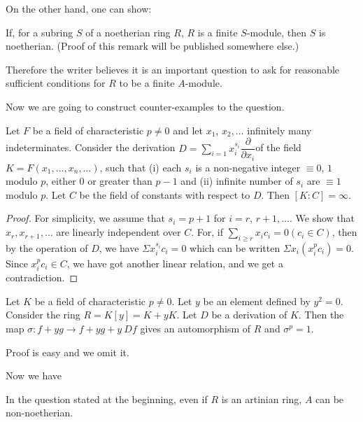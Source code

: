 On the other hand, one can show:

\begin{remark}\label{art16-rem0.7}
If, for a subring $S$ of a noetherian ring $R$, $R$ is a finite $S$-module, then $S$ is noetherian. (Proof of this remark will be published somewhere else.)
\end{remark}

Therefore the writer believes it is an important question to ask for reasonable sufficient conditions for $R$ to be a finite $A$-module.

Now we are going to construct counter-examples to the question.

\begin{proposition}\label{art16-prop0.8}
Let $F$ be a field of characteristic $p\neq 0$ and let $x_{1}$, $x_{2},\ldots$ infinitely many indeterminates. Consider the derivation $D=\sum\limits_{i=1}x^{s_{i}}_{i}\dfrac{\partial}{\partial x_{i}}$\pageoriginale of the field $K=F(x_{1},\ldots,x_{n},\ldots)$, such that {\rm(i)} each $s_{i}$ is a non-negative integer $\equiv 0$, $1$ modulo $p$, either $0$ or greater than $p-1$ and {\rm(ii)} infinite number of $s_{i}$ are $\equiv 1$ modulo $p$. Let $C$ be the field of constants with respect to $D$. Then $[K:C]=\infty$.
\end{proposition}

\begin{proof}
For simplicity, we assume that $s_{i}=p+1$ for $i=r$, $r+1,\ldots$. We show that $x_{r},x_{r+1},\ldots$ are linearly independent over $C$. For, if $\sum\limits_{i\geq r}x_{i}c_{i}=0 (c_{i}\in C)$, then by the operation of $D$, we have $\Sigma x^{s_{i}}_{i}c_{i}=0$ which can be written $\Sigma x_{i}(x^{p}_{i}c_{i})=0$. Since $x^{p}_{i}c_{i}\in C$, we have got another linear relation, and we get a contradiction.
\end{proof}

\begin{proposition}\label{art16-prop0.9}
Let $K$ be a field of characteristic $p\neq 0$. Let $y$ be an element defined by $y^{2}=0$. Consider the ring $R=K[y]=K+yK$. Let $D$ be a derivation of $K$. Then the map $\sigma:f+yg\to f+yg+y \ Df$ gives an automorphism of $R$ and $\sigma^{p}=1$.
\end{proposition}

Proof is easy and we omit it.

Now we have

\begin{proposition}\label{art16-prop0.10}
In the question stated at the beginning, even if $R$ is an artinian ring, $A$ can be non-noetherian.
\end{proposition}

